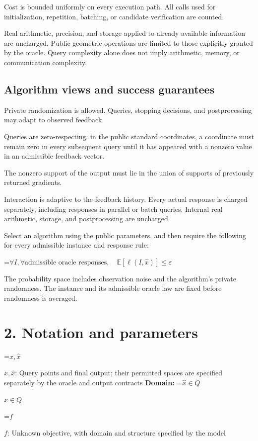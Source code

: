 \documentclass[10pt,a4paper]{article}
\newcommand{\AtlasMath}[1]{\par\begingroup\centering\setbox0=\hbox{$\displaystyle #1$}\ifdim\wd0>1.4\linewidth\typeout{ATLAS WIDE FORMULA: \the\wd0}\fi\ifdim\wd0>\linewidth\resizebox{\linewidth}{!}{\box0}\else\box0\fi\par\endgroup}
\newcommand{\AtlasInlineMath}[1]{\begingroup\setbox0=\hbox{$#1$}\ifdim\wd0>.4\linewidth\endgroup\AtlasMath{#1}\else\endgroup$#1$\fi}
\begin{document}
Cost is bounded uniformly on every execution path. All calls used for initialization, repetition, batching, or candidate verification are counted.

Real arithmetic, precision, and storage applied to already available information are uncharged. Public geometric operations are limited to those explicitly granted by the oracle. Query complexity alone does not imply arithmetic, memory, or communication complexity.

\subsection{Algorithm views and success guarantees}
Private randomization is allowed. Queries, stopping decisions, and postprocessing may adapt to observed feedback.

Queries are zero-respecting: in the public standard coordinates, a coordinate must remain zero in every subsequent query until it has appeared with a nonzero value in an admissible feedback vector.

The nonzero support of the output must lie in the union of supports of previously returned gradients.

Interaction is adaptive to the feedback history. Every actual response is charged separately, including responses in parallel or batch queries. Internal real arithmetic, storage, and postprocessing are uncharged.

Select an algorithm using the public parameters, and then require the following for every admissible instance and response rule:


\AtlasMath{\forall I,\forall\text{admissible oracle responses},\quad\mathbb{E}[\ell(I,\widehat{x})]\le\varepsilon}


The probability space includes observation noise and the algorithm's private randomness. The instance and its admissible oracle law are fixed before randomness is averaged.

\section{2. Notation and parameters}
\AtlasInlineMath{x,\widehat{x}}: Query points and final output; their permitted spaces are specified separately by the oracle and output contracts \textbf{Domain:} \AtlasInlineMath{\widehat{x}\in Q}.

\AtlasInlineMath{f}: Unknown objective, with domain and structure specified by the model
\end{document}
